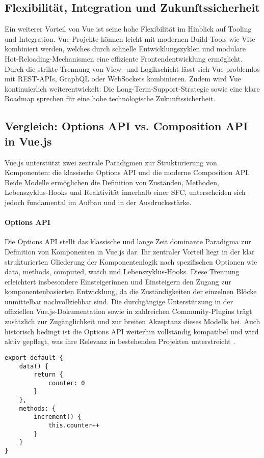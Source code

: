 \subsection{Flexibilität, Integration und Zukunftssicherheit}
Ein weiterer Vorteil von Vue ist seine hohe Flexibilität im Hinblick auf Tooling und Integration. Vue-Projekte können leicht mit modernen Build-Tools wie Vite kombiniert werden, welches durch schnelle Entwicklungszyklen und modulare Hot-Reloading-Mechanismen eine effiziente Frontendentwicklung ermöglicht. Durch die strikte Trennung von View- und Logikschicht lässt sich Vue problemlos mit REST-APIs, GraphQL oder WebSockets kombinieren. Zudem wird Vue kontinuierlich weiterentwickelt: Die Long-Term-Support-Strategie sowie eine klare Roadmap sprechen für eine hohe technologische Zukunftssicherheit.

\subsection{Vergleich: Options API vs. Composition API in Vue.js}
Vue.js unterstützt zwei zentrale Paradigmen zur Strukturierung von Komponenten: die klassische Options API und die moderne Composition API. Beide Modelle ermöglichen die Definition von Zuständen, Methoden, Lebenszyklus-Hooks und Reaktivität innerhalb einer \ac{SFC}, unterscheiden sich jedoch fundamental im Aufbau und in der Ausdrucksstärke.

\paragraph{Options API}
Die Options API stellt das klassische und lange Zeit dominante Paradigma zur Definition von Komponenten in Vue.js dar. Ihr zentraler Vorteil liegt in der klar strukturierten Gliederung der Komponentenlogik nach spezifischen Optionen wie data, methods, computed, watch und Lebenszyklus-Hooks. Diese Trennung erleichtert insbesondere Einsteigerinnen und Einsteigern den Zugang zur komponentenbasierten Entwicklung, da die Zuständigkeiten der einzelnen Blöcke unmittelbar nachvollziehbar sind. Die durchgängige Unterstützung in der offiziellen Vue.js-Dokumentation sowie in zahlreichen Community-Plugins trägt zusätzlich zur Zugänglichkeit und zur breiten Akzeptanz dieses Modells bei. Auch historisch bedingt ist die Options API weiterhin vollständig kompatibel und wird aktiv gepflegt, was ihre Relevanz in bestehenden Projekten unterstreicht \cite{VueGuide2024}.

\begin{lstlisting}[caption=Beispiel Options API]
export default {
	data() {
		return {
			counter: 0
		}
	},
	methods: {
		increment() {
			this.counter++
		}
	}
}
\end{lstlisting}

